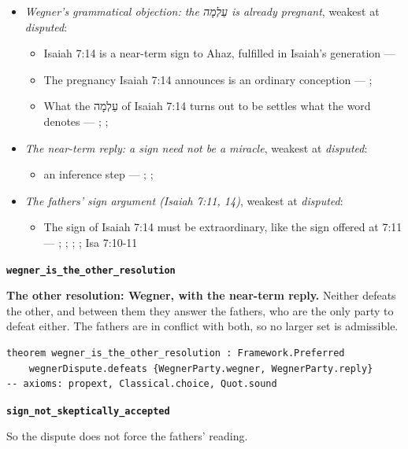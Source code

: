 \documentclass[11pt]{article}
\begin{document}
\begin{itemize}
\item \emph{Wegner's grammatical objection: the עַלְמָה is already pregnant}, weakest at \emph{disputed}:
\begin{itemize}
\item Isaiah 7:14 is a near-term sign to Ahaz, fulfilled in Isaiah's generation --- \cite{brown-birth-messiah-1993}
\item The pregnancy Isaiah 7:14 announces is an ordinary conception --- \cite[476--478]{wegner-virgin-births-2011}; \cite[474]{postell-isaiah-messianic-2025}
\item What the עַלְמָה of Isaiah 7:14 turns out to be settles what the word denotes --- \cite[471--472]{wegner-virgin-births-2011}; \cite[468]{postell-isaiah-messianic-2025}; \cite[152]{rico-gentry-infant-king-2020}
\end{itemize}
\item \emph{The near-term reply: a sign need not be a miracle}, weakest at \emph{disputed}:
\begin{itemize}
\item an inference step --- \cite[64--65]{rhodea-did-matthew-conceive-2013}; \cite[469--470]{wegner-virgin-births-2011}; \cite[474]{postell-isaiah-messianic-2025}
\end{itemize}
\item \emph{The fathers' sign argument (Isaiah 7:11, 14)}, weakest at \emph{disputed}:
\begin{itemize}
\item The sign of Isaiah 7:14 must be extraordinary, like the sign offered at 7:11 --- \cite[I.35]{origen-against-celsus-248}; \cite[84]{justin-dialogue-with-trypho-160}; \cite[III.21.6]{irenaeus-against-heresies-180}; \cite[474]{postell-isaiah-messianic-2025}; Isa 7:10-11
\end{itemize}
\end{itemize}
\par\medskip\noindent\textbf{\texttt{wegner\_\allowbreak{}is\_\allowbreak{}the\_\allowbreak{}other\_\allowbreak{}resolution}}\par\nobreak\noindent
\textbf{The other resolution: Wegner, with the near-term reply.} Neither defeats the other, and between them they answer the fathers, who are the only party to defeat either. The fathers are in conflict with both, so no larger set is admissible.

{\small\begin{verbatim}
theorem wegner_is_the_other_resolution : Framework.Preferred
    wegnerDispute.defeats {WegnerParty.wegner, WegnerParty.reply}
-- axioms: propext, Classical.choice, Quot.sound
\end{verbatim}}
\par\medskip\noindent\textbf{\texttt{sign\_\allowbreak{}not\_\allowbreak{}skeptically\_\allowbreak{}accepted}}\par\nobreak\noindent
So the dispute does not force the fathers' reading.
\end{document}
